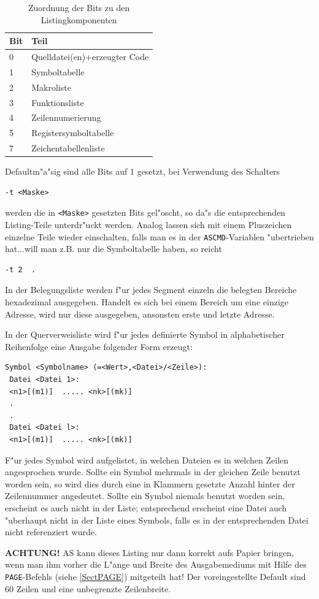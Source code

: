 \documentclass[12pt,a4paper,twoside]{report}
\newcommand{\bb}[1]{{\bf #1}}
\newcommand{\tty}[1]{{\tt #1}}
\newcommand{\asname}{AS}
\begin{document}
\begin{table}[p]
\begin{center}\begin{tabular}{|l|l|}
\hline
Bit & Teil \\
\hline
\hline
0   & Quelldatei(en)+erzeugter Code \\
1   & Symboltabelle \\
2   & Makroliste \\
3   & Funktionsliste \\
4   & Zeilennumerierung \\
5   & Registersymboltabelle \\
7   & Zeichentabellenliste \\
\hline
\end{tabular}\end{center}
\caption{Zuordnung der Bits zu den Listingkomponenten\label{TabTBits}}
\end{table}
Defaultm"a"sig sind alle Bits auf 1 gesetzt, bei Verwendung des Schalters
\begin{verbatim}
-t <Maske>
\end{verbatim}
werden die in \verb!<Maske>! gesetzten Bits gel"oscht, so da"s die entsprechenden
Listing-Teile unterdr"uckt werden.  Analog lassen sich mit einem Pluszeichen
einzelne Teile wieder einschalten, falls man es in der \tty{ASCMD}-Variablen
"ubertrieben hat...will man z.B. nur die Symboltabelle haben, so reicht
\begin{verbatim}
-t 2  .
\end{verbatim}
In der Belegungsliste werden f"ur jedes Segment einzeln die belegten Bereiche
hexadezimal ausgegeben.  Handelt es sich bei einem Bereich um eine einzige
Adresse, wird nur diese ausgegeben, ansonsten erste und letzte Adresse.
\par
In der Querverweisliste wird f"ur jedes definierte Symbol in alphabetischer
Reihenfolge eine Ausgabe folgender Form erzeugt:
\begin{verbatim}
Symbol <Symbolname> (=<Wert>,<Datei>/<Zeile>):
 Datei <Datei 1>:
 <n1>[(m1)]  ..... <nk>[(mk)]
 .
 .
 Datei <Datei l>:
 <n1>[(m1)]  ..... <nk>[(mk)]
\end{verbatim}
F"ur jedes Symbol wird aufgelistet, in welchen Dateien es in welchen Zeilen
angesprochen wurde.  Sollte ein Symbol mehrmals in der gleichen Zeile
benutzt worden sein, so wird dies durch eine in Klammern gesetzte Anzahl
hinter der Zeilennummer angedeutet.  Sollte ein Symbol niemals benutzt
worden sein, erscheint es auch nicht in der Liste; entsprechend erscheint
eine Datei auch "uberhaupt nicht in der Liste eines Symbols, falls es in
der entsprechenden Datei nicht referenziert wurde.
\par
\bb{ACHTUNG!} \asname{} kann dieses Listing nur dann korrekt aufs Papier bringen,
wenn man ihm vorher die L"ange und Breite des Ausgabemediums mit Hilfe des
\tty{PAGE}-Befehls (siehe \ref{SectPAGE}) mitgeteilt hat!  Der voreingestellte
Default sind 60 Zeilen und eine unbegrenzte Zeilenbreite.
\end{document}
